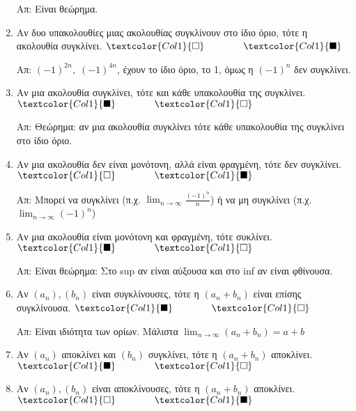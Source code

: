 \begin{enumerate}[itemsep=.5\baselineskip]
    Απ: Είναι θεώρημα. 

  \item \textcolor{Col1}{Αν δυο υπακολουθίες μιας ακολουθίας συγκλίνουν στο ίδιο όριο,
    τότε η ακολουθία συγκλίνει}.
    \hfill $\textcolor{Col1}{\square} \qquad \qquad \textcolor{Col1}{\blacksquare}$

    Απ: $ (-1)^{2n}, \; (-1)^{4n} $, έχουν το ίδιο όριο, το 1, όμως η $ (-1)^{n}
    $ δεν συγκλίνει. 

  \item \textcolor{Col1}{Αν μια ακολουθία συγκλίνει, τότε και κάθε υπακολουθία της
    συγκλίνει}.
    \hfill $\textcolor{Col1}{\blacksquare} \qquad \qquad \textcolor{Col1}{\square}$

    Απ: Θεώρημα: αν μια ακολουθία συγκλίνει τότε κάθε υπακολουθία της συγκλίνει 
    στο ίδιο όριο. 

  \item \textcolor{Col1}{Αν μια ακολουθία δεν είναι μονότονη, αλλά είναι φραγμένη, τότε
    δεν συγκλίνει}.
    \hfill $\textcolor{Col1}{\square} \qquad \qquad \textcolor{Col1}{\blacksquare}$

    Απ: Μπορεί να συγκλίνει (π.χ. $ \lim_{n \to \infty} \frac{(-1)^{n}}{n} $) ή 
    να μη συγκλίνει (π.χ. $ \lim_{n \to \infty} (-1)^{n} $)

  \item \textcolor{Col1}{Αν μια ακολουθία είναι μονότονη και φραγμένη, τότε συκλίνει}.
    \hfill $\textcolor{Col1}{\blacksquare} \qquad \qquad \textcolor{Col1}{\square}$

    Απ: Είναι θεώρημα: Στο sup αν είναι αύξουσα και στο inf αν είναι φθίνουσα.

  \item \textcolor{Col1}{Αν $ (a_{n}), (b_{n}) $ είναι συγκλίνουσες, τότε η 
      $(a_{n}+b_{n})$ είναι επίσης συγκλίνουσα}.
    \hfill $\textcolor{Col1}{\blacksquare} \qquad \qquad \textcolor{Col1}{\square}$

    Απ: Είναι ιδιότητα των ορίων. Μάλιστα $ \lim_{n \to \infty} (a_{n}+b_{n}) =a+b $

  \item \textcolor{Col1}{Αν $ (a_{n}) $ αποκλίνει και $ (b_{n}) $ συγκλίνει, τότε η $
    (a_{n}+b_{n}) $ αποκλίνει}.
    \hfill $\textcolor{Col1}{\blacksquare} \qquad \qquad \textcolor{Col1}{\square}$

  \item \textcolor{Col1}{Αν $ (a_{n}), (b_{n}) $ είναι αποκλίνουσες, τότε η
    $(a_{n}+b_{n})$ αποκλίνει}.
    \hfill $\textcolor{Col1}{\square} \qquad \qquad \textcolor{Col1}{\blacksquare}$


\end{enumerate}
